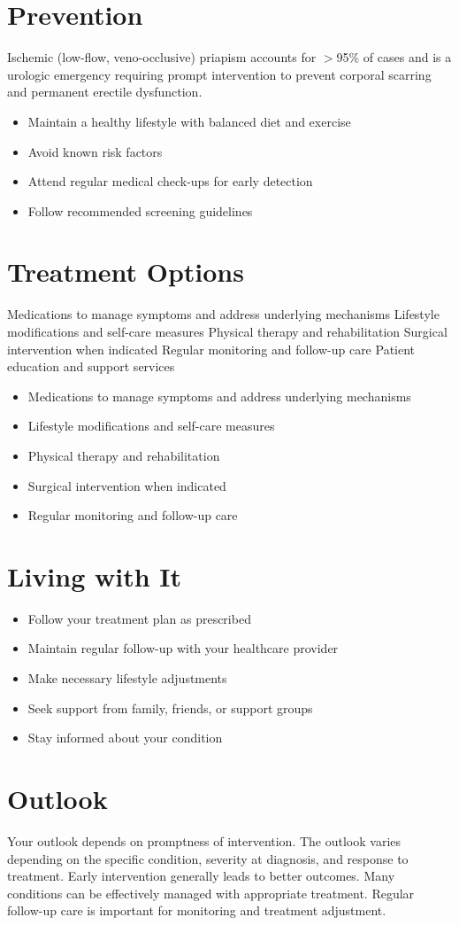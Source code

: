 \section{Prevention}
Ischemic (low-flow, veno-occlusive) priapism accounts for $>$95\% of cases and is a urologic emergency requiring prompt intervention to prevent corporal scarring and permanent erectile dysfunction.

\begin{itemize}[noitemsep]
  \item Maintain a healthy lifestyle with balanced diet and exercise
  \item Avoid known risk factors
  \item Attend regular medical check-ups for early detection
  \item Follow recommended screening guidelines
\end{itemize}
\section{Treatment Options}
Medications to manage symptoms and address underlying mechanisms Lifestyle modifications and self-care measures Physical therapy and rehabilitation Surgical intervention when indicated Regular monitoring and follow-up care Patient education and support services

\begin{itemize}[noitemsep]
  \item Medications to manage symptoms and address underlying mechanisms
  \item Lifestyle modifications and self-care measures
  \item Physical therapy and rehabilitation
  \item Surgical intervention when indicated
  \item Regular monitoring and follow-up care
\end{itemize}
\section{Living with It}
\begin{itemize}[noitemsep]
  \item Follow your treatment plan as prescribed
  \item Maintain regular follow-up with your healthcare provider
  \item Make necessary lifestyle adjustments
  \item Seek support from family, friends, or support groups
  \item Stay informed about your condition
\end{itemize}
\section{Outlook}
Your outlook depends on promptness of intervention. The outlook varies depending on the specific condition, severity at diagnosis, and response to treatment. Early intervention generally leads to better outcomes. Many conditions can be effectively managed with appropriate treatment. Regular follow-up care is important for monitoring and treatment adjustment.
